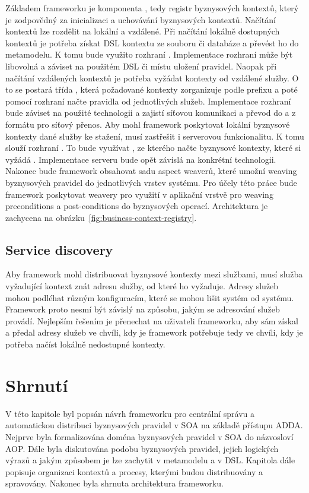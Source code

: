 Základem frameworku je komponenta , tedy registr
byznysových kontextů, který je zodpovědný za inicializaci a uchovávání byznysových kontextů.
Načítání kontextů lze rozdělit na lokální a vzdálené. Při načítání lokálně dostupných kontextů
je potřeba získat \gls{DSL} kontextu ze souboru či databáze a převést ho do metamodelu.
K tomu bude využito rozhraní . Implementace rozhraní může být libovolná
a záviset na použitém \gls{DSL} či místu uložení pravidel. Naopak při načítání vzdálených
kontextů je potřeba vyžádat kontexty od vzdálené služby. O to se postará třída ,
která požadované kontexty zorganizuje podle prefixu a poté pomocí rozhraní  načte
pravidla od jednotlivých služeb. Implementace rozhraní  bude záviset na použité
technologii a zajistí síťovou komunikaci a převod do a z formátu pro síťový přenos.
Aby mohl framework poskytovat lokální byznysové kontexty dané služby ke stažení, musí zastřešit
i serverovou funkcionalitu. K tomu slouží rozhraní . To bude využívat
, ze kterého načte byznysové kontexty, které si vyžádá .
Implementace serveru bude opět závislá na konkrétní technologii.
Nakonec bude framework obsahovat sadu aspect weaverů, které umožní weaving byznysových pravidel do
jednotlivých vrstev systému. Pro účely této práce bude framework poskytovat weavery pro využití v
aplikační vrstvě pro weaving preconditions a post-conditions do byznysových operací.
Architektura je zachycena na obrázku~\ref{fig:business-context-registry}.

\subsection{Service discovery}

Aby framework mohl distribuovat byznysové kontexty mezi službami, musí služba vyžadující kontext
znát adresu služby, od které ho vyžaduje. Adresy služeb mohou podléhat různým konfiguracím,
které se mohou lišit systém od systému. Framework proto nesmí být závislý na způsobu,
jakým se adresování služeb provádí. Nejlepším řešením je přenechat na uživateli frameworku, aby sám
získal a předal adresy služeb ve chvíli, kdy je framework potřebuje \textendash\xspace tedy
ve chvíli, kdy je potřeba načíst lokálně nedostupné kontexty.

\section{Shrnutí}

V této kapitole byl popsán návrh frameworku pro centrální správu a automatickou distribuci
byznysových pravidel v \gls{SOA} na základě přístupu \gls{ADDA}. Nejprve byla formalizována
doména byznysových pravidel v \gls{SOA} do názvosloví \gls{AOP}. Dále byla diskutována podobu byznysových pravidel,
jejich logických výrazů a jakým způsobem je lze zachytit v metamodelu a v \gls{DSL}.
Kapitola dále popisuje organizaci kontextů a procesy, kterými budou distribuovány a spravovány.
Nakonec byla shrnuta architektura frameworku.
